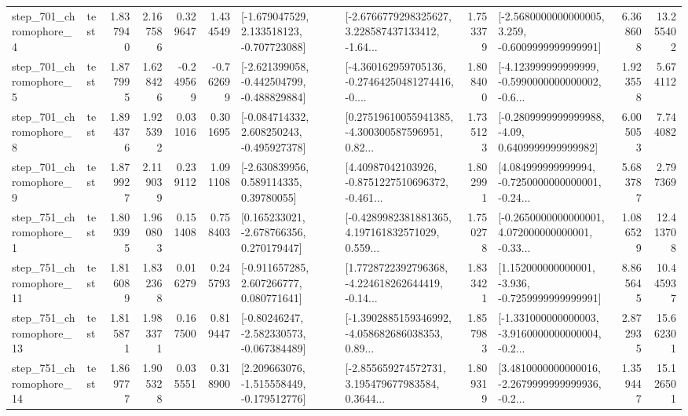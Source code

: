 \begin{tabular}{llrrrrllrlrr}
   step\_701\_chromophore\_4 &      test &      1.837940 &    2.167586 &      0.329647 &  1.434549 &   [-1.679047529, 2.133518123, -0.707723088] &  [-2.6766779298325627, 3.228587437133412, -1.64... &       1.753379 &  [-2.5680000000000005, 3.259, -0.6009999999999991] &            6.368608 &         13.255402 \\
   step\_701\_chromophore\_5 &      test &      1.877995 &    1.628426 &     -0.249569 & -0.762699 &  [-2.621399058, -0.442504799, -0.488829884] &  [-4.360162959705136, -0.27464250481274416, -0.... &       1.808400 &  [-4.123999999999999, -0.5990000000000002, -0.6... &            1.923558 &          5.674112 \\
   step\_701\_chromophore\_8 &      test &      1.894376 &    1.925392 &      0.031016 &  0.301695 &   [-0.084714332, 2.608250243, -0.495927378] &  [0.27519610055941385, -4.300300587596951, 0.82... &       1.735123 &   [-0.2809999999999988, -4.09, 0.6409999999999982] &            6.005053 &          7.744082 \\
   step\_701\_chromophore\_9 &      test &      1.879927 &    2.119039 &      0.239112 &  1.091108 &     [-2.630839956, 0.589114335, 0.39780055] &  [4.40987042103926, -0.8751227510696372, -0.461... &       1.802991 &  [4.084999999999994, -0.7250000000000001, -0.24... &            5.683787 &          2.797369 \\
   step\_751\_chromophore\_1 &      test &      1.809395 &    1.960803 &      0.151408 &  0.758403 &    [0.165233021, -2.678766356, 0.270179447] &  [-0.4289982381881365, 4.197161832571029, 0.559... &       1.750278 &  [-0.2650000000000001, 4.072000000000001, -0.33... &            1.086529 &         12.413708 \\
  step\_751\_chromophore\_11 &      test &      1.816089 &    1.832368 &      0.016279 &  0.245793 &    [-0.911657285, 2.607266777, 0.080771641] &  [1.7728722392796368, -4.224618262644419, -0.14... &       1.833421 &   [1.152000000000001, -3.936, -0.7259999999999991] &            8.865645 &         10.445937 \\
  step\_751\_chromophore\_13 &      test &      1.815871 &    1.983371 &      0.167500 &  0.819447 &   [-0.80246247, -2.582330573, -0.067384489] &  [-1.3902885159346992, -4.058682686038353, 0.89... &       1.857983 &  [-1.331000000000003, -3.9160000000000004, -0.2... &            2.872935 &         15.662301 \\
  step\_751\_chromophore\_14 &      test &      1.869777 &    1.905328 &      0.035551 &  0.318900 &   [2.209663076, -1.515558449, -0.179512776] &  [-2.855659274572731, 3.195479677983584, 0.3644... &       1.809319 &  [3.4810000000000016, -2.2679999999999936, -0.2... &            1.359447 &         15.126501 \\

\end{tabular}
